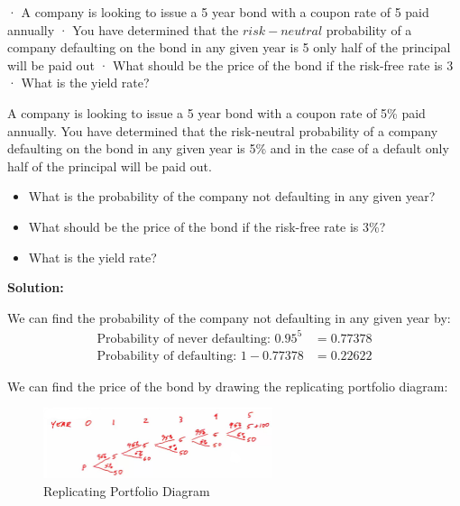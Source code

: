 · A company is looking to issue a 5 year bond with a coupon rate of 5%
paid annually
· You have determined that the $risk-neutral$ probability of a company
defaulting on the bond in any given year is 5%
only half of the principal will be paid out
· What should be the price of the bond if the risk-free rate is 3%
· What is the yield rate?

\begin{example}
    A company is looking to issue a 5 year bond with a coupon rate of 5\% paid annually. You have determined that the risk-neutral probability of a company defaulting on the bond in any given year is 5\% and in the case of a default only half of the principal will be paid out.
    \begin{itemize}
        \item What is the probability of the company not defaulting in any given year?
        \item What should be the price of the bond if the risk-free rate is 3\%?
        \item What is the yield rate?
    \end{itemize}

    \textbf{Solution:}

    We can find the probability of the company not defaulting in any given year by:
    \begin{align*}
        \text{Probability of never defaulting: } 0.95^5 & = 0.77378 \\
        \text{Probability of defaulting: } 1 - 0.77378  & = 0.22622
    \end{align*}

    We can find the price of the bond by drawing the replicating portfolio diagram:
    \begin{figure}
        \centering
        \includegraphics[width=0.6\textwidth]{LECTURE_4/rep5.png}
        \caption{Replicating Portfolio Diagram}
        \label{fig:replicating_portfolio_diagram}
    \end{figure}


\end{example}
